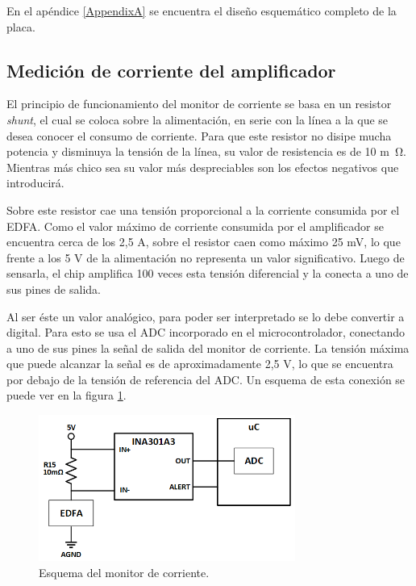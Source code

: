 En el apéndice \ref{AppendixA} se encuentra el diseño esquemático completo de la placa.

\subsection{Medición de corriente del amplificador}

El principio de funcionamiento del monitor de corriente se basa en un resistor \textit{shunt}, el cual se coloca sobre la alimentación, en serie con la línea a la que se desea conocer el consumo de corriente. Para que este resistor no disipe mucha potencia y disminuya la tensión de la línea, su valor de resistencia es de 10 \si{m\ohm}. Mientras más chico sea su valor más despreciables son los efectos negativos que introducirá.

Sobre este resistor cae una tensión proporcional a la corriente consumida por el EDFA. Como el valor máximo de corriente consumida por el amplificador se encuentra cerca de los 2,5 A, sobre el resistor caen como máximo 25 mV, lo que frente a los 5 V de la alimentación no representa un valor significativo. Luego de sensarla, el chip amplifica 100 veces esta tensión diferencial y la conecta a uno de sus pines de salida.

Al ser éste un valor analógico, para poder ser interpretado se lo debe convertir a digital. Para esto se usa el ADC incorporado en el microcontrolador, conectando a uno de sus pines la señal de salida del monitor de corriente. La tensión máxima que puede alcanzar la señal es de aproximadamente 2,5 V, lo que se encuentra por debajo de la tensión de referencia del ADC. Un esquema de esta conexión se puede ver en la figura \ref{fig:funcMonitor}.

\begin{figure}[H]
\centering
\includegraphics[width=0.75\textwidth]{./Figures/func_monitor.png}
\caption{Esquema del monitor de corriente.}
\label{fig:funcMonitor}
\end{figure}


